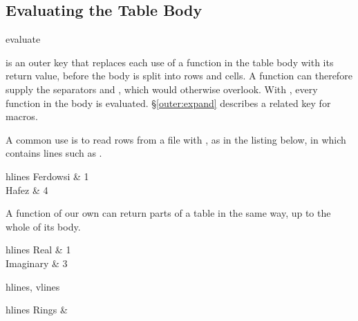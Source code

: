 \subsection{Evaluating the Table Body}
\begin{codedescribe}[
        key,
        new=2022B,
        update=2023A
    ]{evaluate}
    \begin{codesyntax}
    \end{codesyntax}
     is an outer key that replaces each use of a function in the table body with its return value, before the body is split into rows and cells. A function can therefore supply the separators \vrb{&} and \tsverb*{\\}, which  would otherwise overlook. With , every function in the body is evaluated. \S\ref{outer:expand} describes a related key for macros.

    A common use is to read rows from a file with \tsobj[code]{\fileInput}, as in the listing below, in which  contains lines such as .

    \begin{codestore}[st=lib:fun:input]
        \begin{tblr}[evaluate=\fileInput]{hlines}
            Ferdowsi & 1 \\
            Hafez    & 4
        \end{tblr}\end{codestore}
\end{codedescribe}

A function of our own can return parts of a table in the same way, up to the whole of its body.

\begin{codestore}[st=lib:fun:row]
    \IgnoreSpacesOn
    \prgNewFunction {} {
    }
    \prgNewFunction {} {
        \tlSet {}
        \tlPutRight \lTmpaTl {\\}
         {\tlUse \lTmpaTl}
    }
    \IgnoreSpacesOff
    \begin{tblr}[evaluate=\myRow]{hlines}
        Real      & 1 \\
        Imaginary & 3
    \end{tblr}\quad
    \begin{tblr}[evaluate=\emptyGrid]{hlines, vlines}
    \end{tblr}\quad
    \begin{tblr}[evaluate=all]{hlines}
        Rings & 
    \end{tblr}\end{codestore}
\begin{center}
\end{center}

